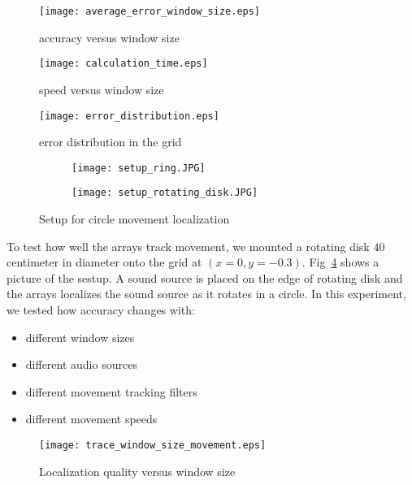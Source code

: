 \begin{figure}[]
\texttt{[image: average\_error\_window\_size.eps]}
\caption{accuracy versus window size}
\label{fig:accuracy_vs_window}
\end{figure}

\begin{figure}[]
\texttt{[image: calculation\_time.eps]}
\caption{speed versus window size}
\label{fig:speed_vs_window}
\end{figure}


\begin{figure}[]
\texttt{[image: error\_distribution.eps]}
\caption{error distribution in the grid}
\label{fig:error_distribution}
\end{figure}

\begin{figure}[]
  \centering
  \begin{subfigure}[]{.2\textwidth}
    \texttt{[image: setup\_ring.JPG]}
  \end{subfigure}
  \begin{subfigure}[]{.2\textwidth}
    \texttt{[image: setup\_rotating\_disk.JPG]}
  \end{subfigure}
  \caption{Setup for circle movement localization}
  \label{fig:setup_circle}
\end{figure}


To test how well the arrays track movement, we mounted a rotating disk $40$ centimeter in diameter onto the grid at $(x=0, y=-0.3)$. Fig~\ref{fig:setup_circle} shows a picture of the sestup. A sound source is placed on the edge of rotating disk and the arrays localizes the sound source as it rotates in a circle. In this experiment, we tested how accuracy changes with:
\begin{itemize}
\item different window sizes
\item different audio sources
\item different movement tracking filters
\item different movement speeds
\end{itemize}


\begin{figure*}[]
\centering
  \texttt{[image: trace\_window\_size\_movement.eps]}
\caption{Localization quality versus window size}\label{fig:wn}
\label{fig:trace_win_circle}
\end{figure*}

